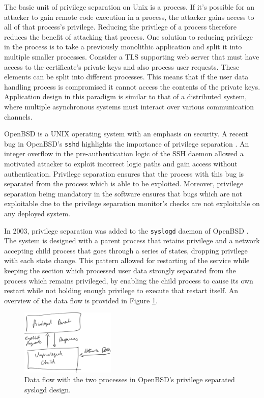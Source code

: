 \documentclass[a4paper,12pt,twoside,openright]{report}
\begin{document}
The basic unit of privilege separation on Unix is a process. If it's possible for an attacker to gain remote code execution in a process, the attacker gains access to all of that process's privilege. Reducing the privilege of a process therefore reduces the benefit of attacking that process. One solution to reducing privilege in the process is to take a previously monolithic application and split it into multiple smaller processes. Consider a TLS supporting web server that must have access to the certificate's private keys and also process user requests. These elements can be split into different processes. This means that if the user data handling process is compromised it cannot access the contents of the private keys. Application design in this paradigm is similar to that of a distributed system, where multiple asynchronous systems must interact over various communication channels.

OpenBSD is a UNIX operating system with an emphasis on security. A recent bug in OpenBSD's \texttt{sshd} highlights the importance of privilege separation \citep{the_openbsd_foundation_openssh_2022}. An integer overflow in the pre-authentication logic of the SSH daemon allowed a motivated attacker to exploit incorrect logic paths and gain access without authentication. Privilege separation ensures that the process with this bug is separated from the process which is able to be exploited. Moreover, privilege separation being mandatory in the software ensures that bugs which are not exploitable due to the privilege separation monitor's checks are not exploitable on any deployed system.

In 2003, privilege separation was added to the \texttt{syslogd} daemon of OpenBSD \citep{madhavapeddy_privsepc_2003}. The system is designed with a parent process that retains privilege and a network accepting child process that goes through a series of states, dropping privilege with each state change. This pattern allowed for restarting of the service while keeping the section which processed user data strongly separated from the process which remains privileged, by enabling the child process to cause its own restart while not holding enough privilege to execute that restart itself. An overview of the data flow is provided in Figure \ref{fig:openbsd-syslogd-privsep}.

\begin{figure}
    \centering
    \includegraphics[width=0.4\textwidth]{figures/openbsd-syslogd-privsep.png}
    \caption{Data flow with the two processes in OpenBSD's privilege separated syslogd design.}
    \label{fig:openbsd-syslogd-privsep}
\end{figure}
\end{document}
